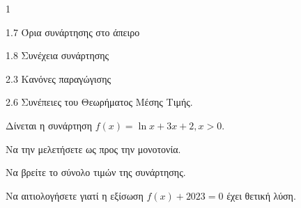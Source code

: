 \begin{ylh}{1}
    \item 1.7 Όρια συνάρτησης στο άπειρο
    \item 1.8 Συνέχεια συνάρτησης
    \item 2.3 Κανόνες παραγώγισης
    \item 2.6 Συνέπειες του Θεωρήματος Μέσης Τιμής.
\end{ylh}
Δίνεται η συνάρτηση $f(x)=\ln x+3x+2, x>0$.
\begin{alist}
    \item Να την μελετήσετε ως προς την μονοτονία. 
    \item \begin{rlist}
        \item Να βρείτε το σύνολο τιμών της συνάρτησης. 
        \item Να αιτιολογήσετε γιατί η εξίσωση $f(x)+2023=0$ έχει θετική λύση. 
    \end{rlist}
\end{alist}